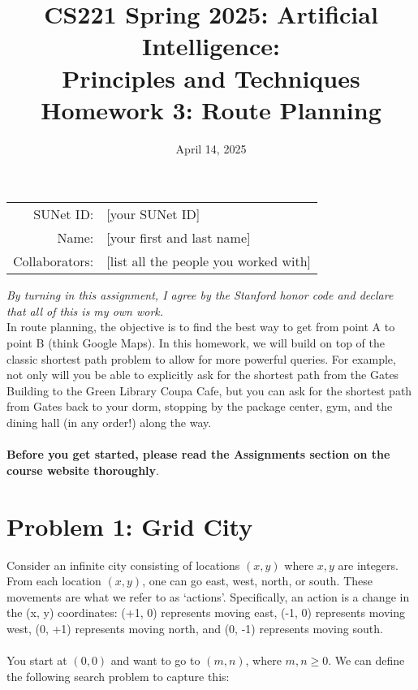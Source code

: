 \documentclass{article}
\title{\textbf{CS221 Spring 2025: Artificial Intelligence:\\ Principles and Techniques} \\Homework 3: Route Planning}
\date{April 14, 2025}
\theoremstyle{case}
\theoremstyle{definition}
\begin{document}
\maketitle

\begin{center}
\begin{tabular}{rl}
SUNet ID: & [your SUNet ID] \\
Name: & [your first and last name] \\
Collaborators: & [list all the people you worked with]
\end{tabular}
\end{center}
\textit{By turning in this assignment, I agree by the Stanford honor code and declare
that all of this is my own work.} \\
\fontsize{12pt}{16pt}\selectfont
In route planning, the objective is to find the best way to get from point A to point B (think Google Maps).
  In this homework, we will build on top of the classic shortest path problem to allow for more powerful queries. For
  example, not only will you be able to explicitly ask for the shortest path from the Gates Building to the Green Library Coupa Cafe, but you can ask for the shortest path from Gates back to your dorm, stopping by the package center,
  gym, and the dining hall (in any order!) along the way. \\ 
  \\
\textbf{Before you get started, please read the Assignments section on the course website thoroughly}.


\section*{Problem 1: Grid City}

Consider an infinite city consisting of locations $(x,y)$ where $x, y$ are integers.
  From each location $(x,y)$, one can go east, west, north, or south. 
  These movements are what we refer to as ‘actions’. 
  Specifically, an action is a change in the (x, y) coordinates: (+1, 0) represents moving east, (-1, 0) 
  represents moving west, (0, +1) represents moving north, and (0, -1) represents moving south.
  \\
  \\
  You start at $(0,0)$ and want to go to $(m, n)$, where $m, n \geq 0$.
  We can define the following search problem to capture this:
 
\end{document}
